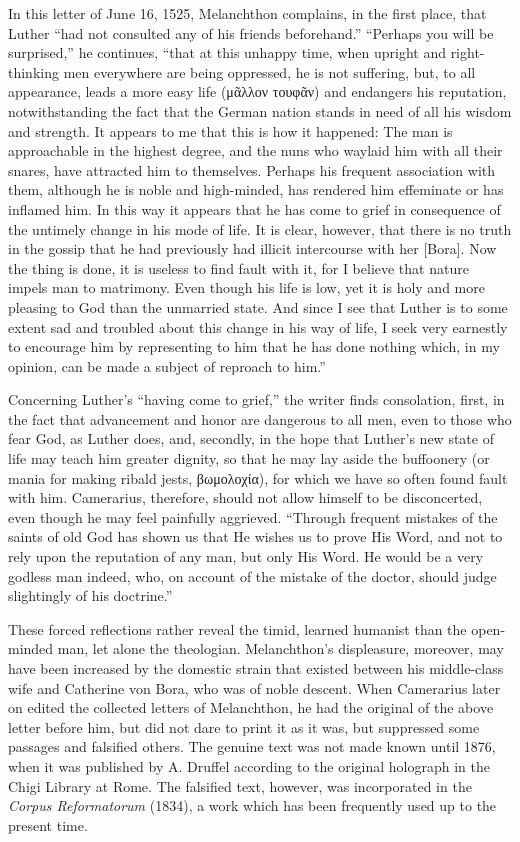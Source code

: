 In this letter of June 16, 1525, Melanchthon complains, in the first place,
that Luther “had not consulted any of his friends beforehand.” “Perhaps
you will be surprised,” he continues, “that at this unhappy time, when
upright and right-thinking men everywhere are being oppressed, he is not
suffering, but, to all appearance, leads a more easy life
(μᾶλλον τουφᾶν)
and endangers his reputation, notwithstanding the fact that the German
nation stands in need of all his wisdom and strength. It appears to me that
this is how it happened: The man is approachable in the highest degree, and
the nuns who waylaid him with all their snares, have attracted him to
themselves. Perhaps his frequent association with them, although he is noble and
high-minded, has rendered him effeminate or has inflamed him. In this way it
appears that he has come to grief in consequence of the untimely change in
his mode of life. It is clear, however, that there is no truth in the gossip that
he had previously had illicit intercourse with her [Bora]. Now the thing is
done, it is useless to find fault with it, for I believe that nature impels man
to matrimony. Even though his life is low, yet it is holy and more pleasing
to God than the unmarried state. And since I see that Luther is to some extent
sad and troubled about this change in his way of life, I seek very
earnestly to encourage him by representing to him that he has done nothing
which, in my opinion, can be made a subject of reproach to him.”

Concerning Luther’s “having come to grief,” the writer finds consolation,
first, in the fact that advancement and honor are dangerous to all men, even
to those who fear God, as Luther does, and, secondly, in the hope that Luther’s
new state of life may teach him greater dignity, so that he may lay
aside the buffoonery (or mania for making ribald jests,
βωμολοχία),
for
which we have so often found fault with him. Camerarius, therefore, should
not allow himself to be disconcerted, even though he may feel painfully
aggrieved. “Through frequent mistakes of the saints of old God has shown
us that He wishes us to prove His Word, and not to rely upon the reputation
of any man, but only His Word. He would be a very godless man indeed,
who, on account of the mistake of the doctor, should judge slightingly of
his doctrine.”

These forced reflections rather reveal the timid, learned humanist
than the open-minded man, let alone the theologian. Melanchthon’s
displeasure, moreover, may have been increased by the domestic
strain that existed between his middle-class wife and Catherine von
Bora, who was of noble descent. When Camerarius later on edited
the collected letters of Melanchthon, he had the original of the
above letter before him, but did not dare to print it as it was, but
suppressed some passages and falsified others. The genuine text was
not made known until 1876, when it was published by A. Druffel
according to the original holograph in the Chigi Library at Rome.
The falsified text, however, was incorporated in the \textit{Corpus Reformatorum}
(1834), a work which has been frequently used up to
the present time.

